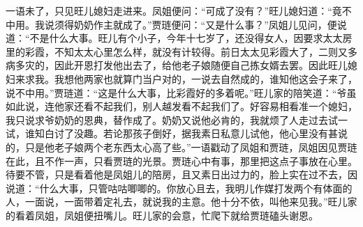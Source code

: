 一语未了，只见旺儿媳妇走进来。凤姐便问：``可成了没有？''旺儿媳妇道：``竟不中用。我说须得奶奶作主就成了。''贾琏便问：``又是什么事？''凤姐儿见问，便说道：``不是什么大事。旺儿有个小子，今年十七岁了，还没得女人，因要求太太房里的彩霞，不知太太心里怎么样，就没有计较得。前日太太见彩霞大了，二则又多病多灾的，因此开恩打发他出去了，给他老子娘随便自己拣女婿去罢。因此旺儿媳妇来求我。我想他两家也就算门当户对的，一说去自然成的，谁知他这会子来了，说不中用。''贾琏道：``这是什么大事，比彩霞好的多着呢。''旺儿家的陪笑道：``爷虽如此说，连他家还看不起我们，别人越发看不起我们了。好容易相看准一个媳妇，我只说求爷奶奶的恩典，替作成了。奶奶又说他必肯的，我就烦了人走过去试一试，谁知白讨了没趣。若论那孩子倒好，据我素日私意儿试他，他心里没有甚说的，只是他老子娘两个老东西太心高了些。''一语戳动了凤姐和贾琏，凤姐因见贾琏在此，且不作一声，只看贾琏的光景。贾琏心中有事，那里把这点子事放在心里。待要不管，只是看着他是凤姐儿的陪房，且又素日出过力的，脸上实在过不去，因说道：``什么大事，只管咕咕唧唧的。你放心且去，我明儿作媒打发两个有体面的人，一面说，一面带着定礼去，就说我的主意。他十分不依，叫他来见我。''旺儿家的看着凤姐，凤姐便扭嘴儿。旺儿家的会意，忙爬下就给贾琏磕头谢恩。


